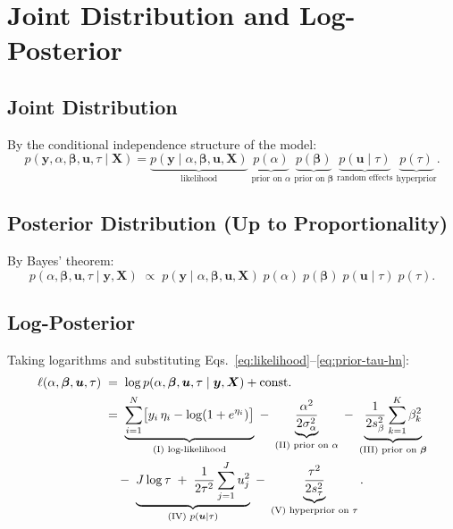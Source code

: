\documentclass[11pt]{article}
\newcommand{\bX}{\bm{X}}
\newcommand{\by}{\bm{y}}
\newcommand{\bbeta}{\bm{\beta}}
\newcommand{\bu}{\bm{u}}
\begin{document}
\section{Joint Distribution and Log-Posterior}
\label{sec:posterior}

\subsection{Joint Distribution}

By the conditional independence structure of the model:
\begin{equation}\label{eq:joint}
  p(\by,\alpha,\bbeta,\bu,\tau \mid \bX)
  = \underbrace{p(\by \mid \alpha,\bbeta,\bu,\bX)}_{\text{likelihood}}
    \;\underbrace{p(\alpha)}_{\text{prior on }\alpha}
    \;\underbrace{p(\bbeta)}_{\text{prior on }\bbeta}
    \;\underbrace{p(\bu\mid\tau)}_{\text{random effects}}
    \;\underbrace{p(\tau)}_{\text{hyperprior}}.
\end{equation}

\subsection{Posterior Distribution (Up to Proportionality)}

By Bayes' theorem:
\begin{equation}\label{eq:posterior}
  p(\alpha,\bbeta,\bu,\tau \mid \by, \bX)
  \;\propto\;
  p(\by \mid \alpha,\bbeta,\bu,\bX)\;
  p(\alpha)\;p(\bbeta)\;p(\bu\mid\tau)\;p(\tau).
\end{equation}

\subsection{Log-Posterior}

Taking logarithms and substituting Eqs.~\eqref{eq:likelihood}--\eqref{eq:prior-tau-hn}:
\begin{align}\label{eq:log-posterior}
  \ell(\alpha,\bbeta,\bu,\tau)
  &\;=\; \log p(\alpha,\bbeta,\bu,\tau \mid \by,\bX) + \text{const.} \notag\\
  &\;=\;
  \underbrace{\sum_{i=1}^{N}
    \bigl[y_i\,\eta_i - \log(1+e^{\eta_i})\bigr]}_{\text{(I) log-likelihood}}
  \;-\;
  \underbrace{\frac{\alpha^2}{2\sigma_\alpha^2}}_{\text{(II) prior on }\alpha}
  \;-\;
  \underbrace{\frac{1}{2s_\beta^2}\sum_{k=1}^{K}\beta_k^2}_{\text{(III) prior on }\bbeta}
  \notag\\
  &\quad\;-\;
  \underbrace{J\log\tau \;+\;
  \frac{1}{2\tau^2}\sum_{j=1}^{J}u_j^2}_{\text{(IV) }p(\bu\mid\tau)}
  \;-\;
  \underbrace{\frac{\tau^2}{2s_\tau^2}}_{\text{(V) hyperprior on }\tau}.
\end{align}
\end{document}
